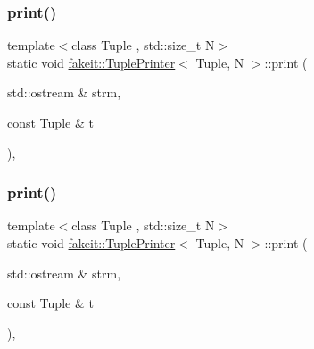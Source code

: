 \subsubsection{\texorpdfstring{print()}{print()}\hspace{0.1cm}{\footnotesize\ttfamily [5/9]}}
{\footnotesize\ttfamily template$<$class Tuple , std\+::size\+\_\+t N$>$ \\
static void \mbox{\hyperlink{structfakeit_1_1TuplePrinter}{fakeit\+::\+Tuple\+Printer}}$<$ Tuple, N $>$\+::print (\begin{DoxyParamCaption}\item[{std\+::ostream \&}]{strm,  }\item[{const Tuple \&}]{t }\end{DoxyParamCaption})\hspace{0.3cm}{\ttfamily [inline]}, {\ttfamily [static]}}

\mbox{\label{structfakeit_1_1TuplePrinter_a1c46b4cc8914280abd0f6a83a56db9b9}} 
\subsubsection{\texorpdfstring{print()}{print()}\hspace{0.1cm}{\footnotesize\ttfamily [6/9]}}
{\footnotesize\ttfamily template$<$class Tuple , std\+::size\+\_\+t N$>$ \\
static void \mbox{\hyperlink{structfakeit_1_1TuplePrinter}{fakeit\+::\+Tuple\+Printer}}$<$ Tuple, N $>$\+::print (\begin{DoxyParamCaption}\item[{std\+::ostream \&}]{strm,  }\item[{const Tuple \&}]{t }\end{DoxyParamCaption})\hspace{0.3cm}{\ttfamily [inline]}, {\ttfamily [static]}}

\mbox{\label{structfakeit_1_1TuplePrinter_a1c46b4cc8914280abd0f6a83a56db9b9}} 
